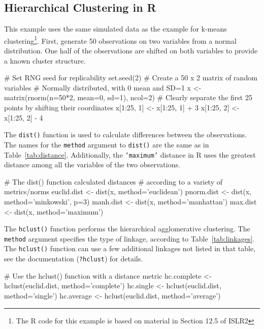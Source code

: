 \begin{withcode}
\subsection{Hierarchical Clustering in R}

This example uses the same simulated data as the example for k-means clustering\footnote{The R code for this example is based on material in Section 12.5 of ISLR2}. First, generate 50 observations on two variables from a normal distribution. One half of the observations are shifted on both variables to provide a known cluster structure.

\begin{Rcode}
# Set RNG seed for replicability
set.seed(2)
# Create a 50 x 2 matrix of random variables 
# Normally distributed, with 0 mean and SD=1
x <- matrix(rnorm(n=50*2, mean=0, sd=1), ncol=2)
# Clearly separate the first 25 points by shifting their coordinates
x[1:25, 1] <- x[1:25, 1] + 3
x[1:25, 2] <- x[1:25, 2] - 4
\end{Rcode}

The \texttt{dist()} function is used to calculate differences between the observations. The names for the \texttt{method} argument to \texttt{dist()} are the same as in Table~\ref{tab:distance}. Additionally, the \texttt{'maximum'} distance in R uses the greatest distance among all the variables of the two observations. 

\begin{Rcode}
# The dist() function calculated distances
# according to a variety of metrics/norms
euclid.dist <- dist(x, method='euclidean')
pnorm.dist <- dist(x, method='minkowski', p=3)
manh.dist <- dist(x, method='manhattan')
max.dist <- dist(x, method='maximum')
\end{Rcode}

The \texttt{hclust()} function performs the hierarchical agglomerative clustering. The \texttt{method} argument specifies the type of linkage, according to Table~\ref{tab:linkages}. The \texttt{hclust()} function can use a few additional linkages not listed in that table, see the documentation (\texttt{?hclust}) for details. 

\begin{Rcode}
# Use the hclust() function with a distance metric
hc.complete <- hclust(euclid.dist, method='complete')
hc.single <- hclust(euclid.dist, method='single')
hc.average <- hclust(euclid.dist, method='average')
\end{Rcode}


\end{withcode}
